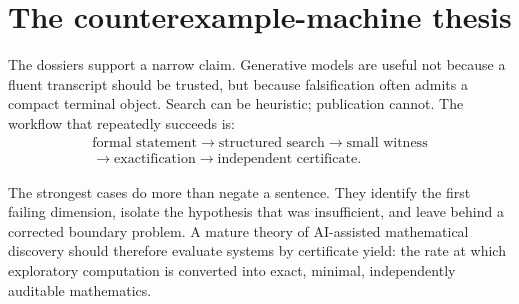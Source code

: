 \section{The counterexample-machine thesis}

The dossiers support a narrow claim.  Generative models are useful not because a fluent transcript should be trusted, but because falsification often admits a compact terminal object.  Search can be heuristic; publication cannot.  The workflow that repeatedly succeeds is:
\[
\begin{gathered}
\text{formal statement}\longrightarrow\text{structured search}
\longrightarrow\text{small witness}\\
\longrightarrow\text{exactification}
\longrightarrow\text{independent certificate}.
\end{gathered}
\]

The strongest cases do more than negate a sentence.  They identify the first failing dimension, isolate the hypothesis that was insufficient, and leave behind a corrected boundary problem.  A mature theory of AI-assisted mathematical discovery should therefore evaluate systems by certificate yield: the rate at which exploratory computation is converted into exact, minimal, independently auditable mathematics.
